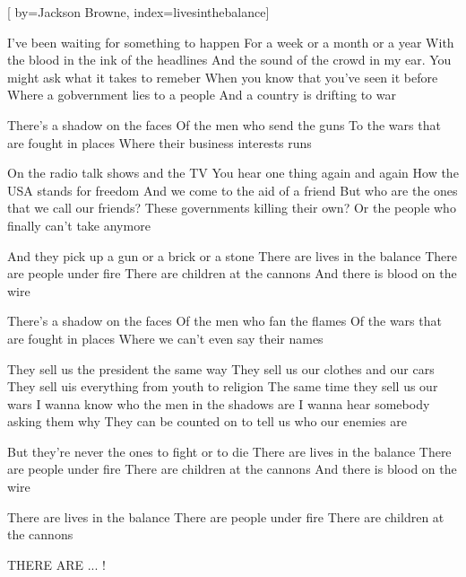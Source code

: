 
[%
    by={Jackson Browne},
    index={livesinthebalance}]


    \label{livesinthebalance}

    \beginverse
        I've been waiting for something to happen
        For a week or a month or a year
        With the blood in the ink of the headlines
        And the sound of the crowd in my ear.
        You might ask what it takes to remeber
        When you know that you've seen it before
        Where a gobvernment lies to a people
        And a country is drifting to war
    \endverse

    \beginchorus
        There's a shadow on the faces
        Of the men who send the guns
        To the wars that are fought in places
        Where their business interests runs
    \endchorus

    \beginverse
        On the radio talk shows and the TV
        You hear one thing again and again
        How the USA stands for freedom
        And we come to the aid of a friend
        But who are the ones that we call our friends?
        These governments killing their own?
        Or the people who finally can't take anymore
    \endverse

    \beginchorus
        And they pick up a gun or a brick or a stone
        There are lives in the balance 
        There are people under fire 
        There are children at the cannons 
        And there is blood on the wire
    \endchorus

    \beginchorus
        There's a shadow on the faces
        Of the men who fan the flames
        Of the wars that are fought in places
        Where we can't even say their names
    \endchorus

    \beginverse
        They sell us the president the same way
        They sell us our clothes and our cars
        They sell uis everything from youth to religion
        The same time they sell us our wars
        I wanna know who the men in the shadows are
        I wanna hear somebody asking them why
        They can be counted on to tell us who our enemies are
    \endverse

    \beginchorus
        But they're never the ones to fight or to die
        There are lives in the balance 
        There are people under fire 
        There are children at the cannons 
        And there is blood on the wire
    \endchorus

    \beginchorus
        There are lives in the balance
        There are people under fire
        There are children at the cannons

        THERE ARE ... !
    \endchorus
\endsong
